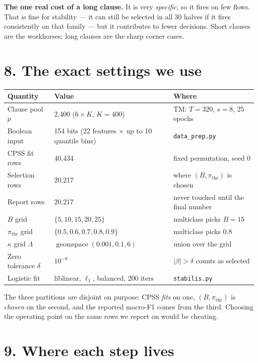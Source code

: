 \documentclass[11pt]{article}
\begin{document}
\textbf{The one real cost of a long clause.} It is very \emph{specific}, so
it fires on few flows. That is fine for stability --- it can still be
selected in all 30 halves if it fires consistently on that family --- but it
contributes to fewer decisions. Short clauses are the workhorses; long
clauses are the sharp corner cases.

\section*{8. The exact settings we use}

\begin{center}
\footnotesize
\begin{tabular}{@{}lll@{}}
\toprule
Quantity & Value & Where \\
\midrule
Clause pool $p$ & 2{,}400 ($6\times K$, $K=400$) & TM: $T=320$, $s=8$, 25 epochs \\
Boolean input & 154 bits (22 features $\times$ up to 10 quantile bins) & \texttt{data\_prep.py} \\
CPSS fit rows & 40{,}434 & fixed permutation, seed 0 \\
Selection rows & 20{,}217 & where $(B,\pi_{\mathrm{thr}})$ is chosen \\
Report rows & 20{,}217 & never touched until the final number \\
$B$ grid & $\{5,10,15,20,25\}$ & multiclass picks $B=15$ \\
$\pi_{\mathrm{thr}}$ grid & $\{0.5,0.6,0.7,0.8,0.9\}$ & multiclass picks $0.8$ \\
$\kappa$ grid $\Lambda$ & $\operatorname{geomspace}(0.001,0.1,6)$ & union over the grid \\
Zero tolerance $\delta$ & $10^{-8}$ & $|\beta|>\delta$ counts as selected \\
Logistic fit & liblinear, $\ell_1$, balanced, 200 iters & \texttt{stabilis.py} \\
\bottomrule
\end{tabular}
\end{center}

The three partitions are disjoint on purpose: CPSS \emph{fits} on one,
$(B,\pi_{\mathrm{thr}})$ is \emph{chosen} on the second, and the reported
macro-F1 comes from the third. Choosing the operating point on the same rows
we report on would be cheating.

\section*{9. Where each step lives}
\end{document}
